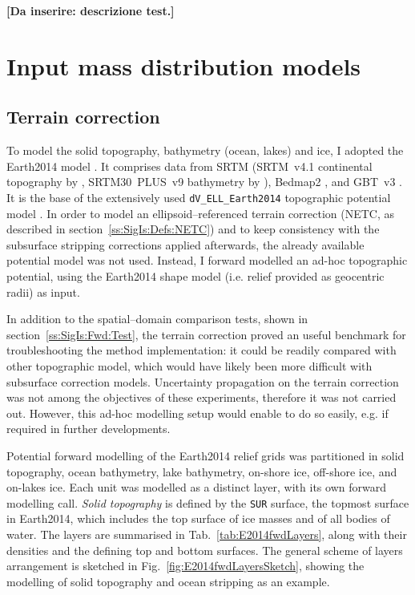 \begin{center}
    \textbf{[Da inserire: descrizione test.]}
\end{center}



\section{Input mass distribution models}
\label{s:SigIs:InModels}

\subsection{Terrain correction}
\label{ss:SigIs:InModels:TC}
To model the solid topography, bathymetry (ocean, lakes) and ice, I adopted the {Earth2014} model \parencite{Hirt2015}.
It comprises data from SRTM (SRTM~v4.1 continental topography by \cite{Jarvis2008_SRTM4}, SRTM30~PLUS~v9 bathymetry by \cite{Becker_SRTM30plus}), Bedmap2 \parencite{Fretwell2013_Bedmap}, and GBT~v3 \parencite{Bamber2013_GBT}.
It is the base of the extensively used \verb|dV_ELL_Earth2014| topographic potential model \parencite{Rexer2016}.
In order to model an ellipsoid--referenced terrain correction (NETC, as described in section~\ref{ss:SigIs:Defs:NETC}) and to keep consistency with the subsurface stripping corrections applied afterwards, the already available potential model was not used.
Instead, I forward modelled an ad-hoc topographic potential, using the {Earth2014} shape model (i.e. relief provided as geocentric radii) as input.

In addition to the spatial--domain comparison tests, shown in section~\ref{ss:SigIs:Fwd:Test}, the terrain correction proved an useful benchmark for troubleshooting the method implementation: it could be readily compared with other topographic model, which would have likely been more difficult with subsurface correction models.
Uncertainty propagation on the terrain correction was not among the objectives of these experiments, therefore it was not carried out.
However, this ad-hoc modelling setup would enable to do so easily, e.g. if required in further developments.

Potential forward modelling of the {Earth2014} relief grids was partitioned in solid topography, ocean bathymetry, lake bathymetry, on-shore ice, off-shore ice, and on-lakes ice.
Each unit was modelled as a distinct layer, with its own forward modelling call.
\textit{Solid topography} is defined by the \verb|SUR| surface, the topmost surface in {Earth2014}, which includes the top surface of ice masses and of all bodies of water.
The layers are summarised in Tab.~\ref{tab:E2014fwdLayers}, along with their densities and the defining top and bottom surfaces.
The general scheme of layers arrangement is sketched in Fig.~\ref{fig:E2014fwdLayersSketch}, showing the modelling of solid topography and ocean stripping as an example.

